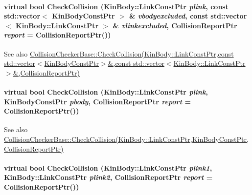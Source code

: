 \hypertarget{classOpenRAVE_1_1EnvironmentBase_a8c2bdc1a68281fb48214f3c141dc26a9}{
\paragraph[{CheckCollision}]{\setlength{\rightskip}{0pt plus 5cm}virtual bool CheckCollision (KinBody::LinkConstPtr {\em plink}, \/  const std::vector$<$ KinBodyConstPtr $>$ \& {\em vbodyexcluded}, \/  const std::vector$<$ KinBody::LinkConstPtr $>$ \& {\em vlinkexcluded}, \/  CollisionReportPtr {\em report} = {\ttfamily CollisionReportPtr()})}\hfill}
\label{classOpenRAVE_1_1EnvironmentBase_a8c2bdc1a68281fb48214f3c141dc26a9}
\begin{DoxySeeAlso}{See also}
\hyperlink{classOpenRAVE_1_1CollisionCheckerBase_a8c2bdc1a68281fb48214f3c141dc26a9}{CollisionCheckerBase::CheckCollision(KinBody::LinkConstPtr,const std::vector$<$KinBodyConstPtr$>$\&,const std::vector$<$KinBody::LinkConstPtr$>$\&,CollisionReportPtr)} 
\end{DoxySeeAlso}
\hypertarget{classOpenRAVE_1_1EnvironmentBase_ab14f3598db6c781c3f2f6ef188fdeb3f}{
\paragraph[{CheckCollision}]{\setlength{\rightskip}{0pt plus 5cm}virtual bool CheckCollision (KinBody::LinkConstPtr {\em plink}, \/  KinBodyConstPtr {\em pbody}, \/  CollisionReportPtr {\em report} = {\ttfamily CollisionReportPtr()})}\hfill}
\label{classOpenRAVE_1_1EnvironmentBase_ab14f3598db6c781c3f2f6ef188fdeb3f}
\begin{DoxySeeAlso}{See also}
\hyperlink{classOpenRAVE_1_1CollisionCheckerBase_ab14f3598db6c781c3f2f6ef188fdeb3f}{CollisionCheckerBase::CheckCollision(KinBody::LinkConstPtr,KinBodyConstPtr,CollisionReportPtr)} 
\end{DoxySeeAlso}
\hypertarget{classOpenRAVE_1_1EnvironmentBase_abc391362f1952f15cd5a27fdd9b8a65d}{
\paragraph[{CheckCollision}]{\setlength{\rightskip}{0pt plus 5cm}virtual bool CheckCollision (KinBody::LinkConstPtr {\em plink1}, \/  KinBody::LinkConstPtr {\em plink2}, \/  CollisionReportPtr {\em report} = {\ttfamily CollisionReportPtr()})}\hfill}
